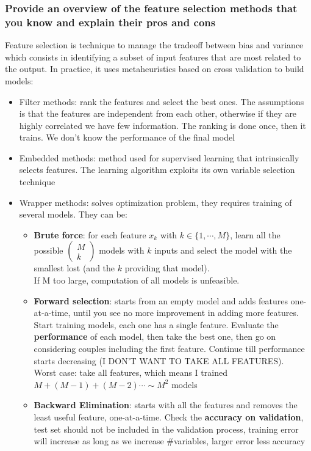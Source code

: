 \subsubsection{Provide an overview of the feature selection methods that you know and explain their pros and cons}
    Feature selection is technique to manage the tradeoff between bias and variance which consists in identifying a subset of input features that are most related to the output. In practice, it uses metaheuristics based on cross validation to build models:
    \begin{itemize}
        \item Filter methods: rank the features and select the best ones. The assumptions is that the features are independent from each other, otherwise if they are highly correlated we have few information. The ranking is done once, then it trains. We don't know the performance of the final model
        \item Embedded methods: method used for supervised learning that intrinsically selects features. The learning algorithm exploits its own variable selection technique
        \item Wrapper methods: solves optimization problem, they requires training of several models. They can be:
        \begin{itemize}
            \item \textbf{Brute force}: for each feature $x_k$ with $k\in\{1,\cdots,M\}$, learn all the possible $\begin{pmatrix}
                M \\ k
            \end{pmatrix}$ models with $k$ inputs and select the model with the smallest lost (and the $k$ providing that model).\\
            If M too large, computation of all models is unfeasible.
            \item \textbf{Forward selection}: starts from an empty model and adds features one-at-a-time, until you see no more improvement in adding more features.\\
            Start training models, each one has a single feature. Evaluate the \textbf{performance} of each model, then take the best one, then go on considering couples including the first feature. Continue till performance starts decreasing (I DON'T WANT TO TAKE ALL FEATURES).\\
            Worst case: take all features, which means I trained $M+(M-1)+(M-2)\cdots\sim M^2$ models
            \item \textbf{Backward Elimination}: starts with all the features and removes the least useful feature, one-at-a-time. Check the \textbf{accuracy on validation}, test set should not be included in the validation process, training error will increase as long as we increase \#variables, larger error less accuracy
        \end{itemize}
    \end{itemize}

